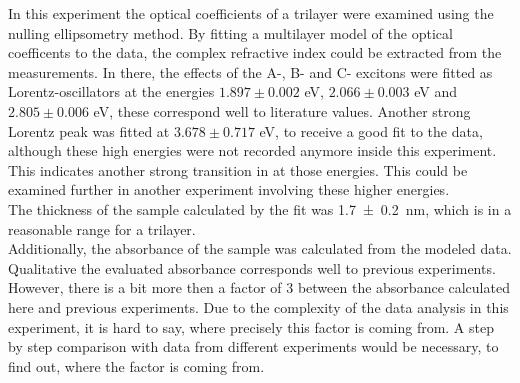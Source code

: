\documentclass[english]{article}
\begin{document}
In this experiment the optical coefficients of a  trilayer were examined using the nulling ellipsometry method. By fitting a multilayer model of the optical coefficents to the data, the complex refractive index could be extracted from the measurements. In there, the effects of the A-, B- and C- excitons were fitted as Lorentz-oscillators at the energies $1.897 \pm 0.002$ eV, $2.066 \pm 0.003$ eV and $2.805 \pm 0.006$ eV, these correspond well to literature values. Another strong Lorentz peak was fitted at $3.678 \pm 0.717$ eV, to receive a good fit to the data, although these high energies were not recorded anymore inside this experiment. This indicates another strong transition in  at those energies. This could be examined further in another experiment involving these higher energies.\\
The thickness of the sample calculated by the fit was \SI{1.7 \pm 0.2}{nm}, which is in a reasonable range for a  trilayer.\\
Additionally, the absorbance of the sample was calculated from the modeled data. Qualitative the evaluated absorbance corresponds well to previous experiments. However, there is a bit more then a factor of 3 between the absorbance calculated here and previous experiments. Due to the complexity of the data analysis in this experiment, it is hard to say, where precisely this factor is coming from. A step by step comparison with data from different experiments would be necessary, to find out, where the factor is coming from.


\newpage





\appendix
\end{document}
